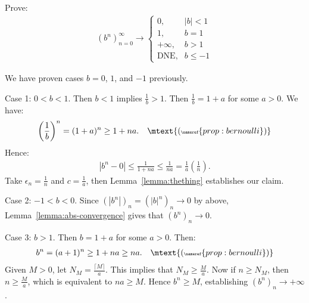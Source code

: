     \begin{example}
        Prove:
            \begin{equation*}
            \begin{split}
                (b^n)_{n=0}^\infty \rightarrow \begin{cases} 0, & |b| < 1 \\ 1,& b = 1 \\ +\infty, & b > 1 \\ \text{DNE},& b \leq -1\end{cases}
            \end{split}
            \end{equation*}
    \end{example}
        \begin{solution}
            We have proven cases $b = 0$, $1$, and $-1$ previously.

            Case 1: $0 < b < 1$. Then $b<1$ implies $\frac{1}{b} > 1$. Then $\frac{1}{b} = 1+a$ for some $a>0$. We have:
                \begin{equation*}
                \begin{split}
                    \left(\frac{1}{b}\right)^n = (1+a)^n \geq 1+na. \quad\mtext{\tiny (\nameref{prop:bernoulli})}
                \end{split}
                \end{equation*}
            Hence:
                \begin{equation*}
                \begin{split}
                    |b^n - 0| \leq \frac{1}{1+na} \leq \frac{1}{na} = \frac{1}{a}\left(\frac{1}{n}\right).
                \end{split}
                \end{equation*}
            Take $\epsilon_n = \frac{1}{n}$ and $c = \frac{1}{a}$, then Lemma~\ref{lemma:thething} establishes our claim.

            Case 2: $-1 < b < 0$. Since $(|b^n|)_n = (|b|^n)_n \rightarrow 0$ by above, Lemma~\ref{lemma:abs-convergence} gives that $(b^n)_n \rightarrow 0$.

            Case 3: $b > 1$. Then $b = 1+a$ for some $a > 0$. Then:
                \begin{equation*}
                \begin{split}
                    b^n = (a+1)^n \geq 1+na \geq na. \quad \mtext{\tiny (\nameref{prop:bernoulli})}
                \end{split}
                \end{equation*}
            Given $M>0$, let $N_M = \frac{\lceil M \rceil}{a}$. This implies that $N_M \geq \frac{M}{a}$. Now if $n\geq N_M$, then $n \geq \frac{M}{a}$, which is equivalent to $na \geq M$. Hence $b^n \geq M$, establishing $(b^n)_n \rightarrow +\infty$.


\end{solution}
